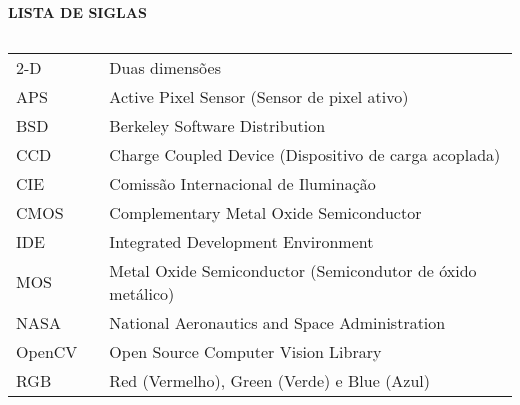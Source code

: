\newpage

\begin{center}
\textbf{LISTA DE SIGLAS}
\end{center}
$\!$\\

\begin{tabular}{lll}
2-D & \hspace{1cm} & Duas dimensões \\

APS & \hspace{1cm} & Active Pixel Sensor (Sensor de pixel ativo) \\

BSD & \hspace{1cm} & Berkeley Software Distribution \\

CCD & \hspace{1cm} & Charge Coupled Device (Dispositivo de carga acoplada) \\

CIE & \hspace{1cm} & Comissão Internacional de Iluminação \\

CMOS & \hspace{1cm} & Complementary Metal Oxide Semiconductor \\

IDE & \hspace{1cm} & Integrated Development Environment \\

MOS & \hspace{1cm} & Metal Oxide Semiconductor (Semicondutor de óxido metálico) \\

NASA & \hspace{1cm} & National Aeronautics and Space Administration \\

OpenCV & \hspace{1cm} & Open Source Computer Vision Library \\

RGB & \hspace{1cm} & Red (Vermelho), Green (Verde) e Blue (Azul) \\

\end{tabular}